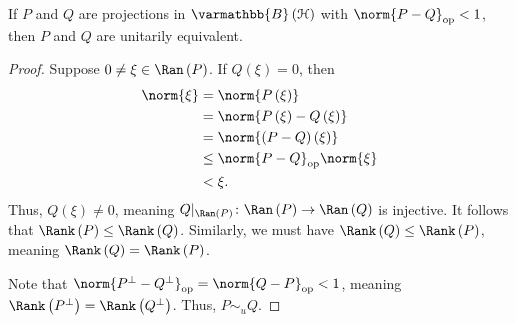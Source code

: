 \documentclass[10pt]{mypackage}
\renewcommand*{\mathbb}[1]{\varmathbb{#1}}
\newcommand{\B}{\mathbb{B}}
\begin{document}
\begin{fact}
  If $P$ and $Q$ are projections in $\B\left(\mathcal{H}\right)$ with $\norm{P-Q}_{\text{op}} < 1$, then $P$ and $Q$ are unitarily equivalent.
\end{fact}
\begin{proof}
  Suppose $0\neq \xi\in \Ran\left(P\right)$. If $Q\left(\xi\right) = 0$, then
  \begin{align*}
    \norm{\xi} &= \norm{P\left(\xi\right)}\\
               &= \norm{P\left(\xi\right) - Q\left(\xi\right)}\\
               &= \norm{\left(P-Q\right)\left(\xi\right)}\\
               &\leq \norm{P-Q}_{\text{op}} \norm{\xi}\\
               & < \xi.
  \end{align*}
  Thus, $Q\left(\xi\right) \neq 0$, meaning $Q|_{\Ran\left(P\right)}\colon \Ran\left(P\right)\rightarrow \Ran\left(Q\right)$ is injective. It follows that $\Rank\left(P\right) \leq \Rank\left(Q\right)$. Similarly, we must have $\Rank\left(Q\right) \leq \Rank\left(P\right)$, meaning $\Rank\left(Q\right) = \Rank\left(P\right)$.\newline

  Note that $\norm{P^{\perp} - Q^{\perp}}_{\text{op}} = \norm{Q - P}_{\text{op}} < 1$, meaning $\Rank\left(P^{\perp}\right) = \Rank\left(Q^{\perp}\right)$. Thus, $P\sim_{u}Q$.
\end{proof}
\end{document}
